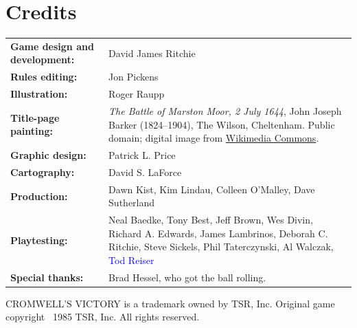\section*{Credits}

\begin{tcolorbox}[colback=cvsand!35,colframe=cvred,boxrule=.6pt,arc=1pt]
\small
\begin{tabularx}{\textwidth}{@{}>{\bfseries}l X@{}}
  Game design and development: & David James Ritchie \\
  Rules editing: & Jon Pickens \\
  Illustration: & Roger Raupp \\
  Title-page painting: & \textit{The Battle of Marston Moor, 2 July 1644}, John Joseph Barker (1824--1904), The Wilson, Cheltenham. Public domain; digital image from \href{https://commons.wikimedia.org/wiki/File:Battle_of_Marston_Moor_1644_by_John_Barker.png}{Wikimedia Commons}. \\
  Graphic design: & Patrick L. Price \\
  Cartography: & David S. LaForce \\
  Production: & Dawn Kist, Kim Lindau, Colleen O'Malley, Dave Sutherland \\
  Playtesting: & Neal Baedke, Tony Best, Jeff Brown, Wes Divin, Richard A. Edwards, James Lambrinos, Deborah C. Ritchie, Steve Sickels, Phil Taterczynski, Al Walczak, \textcolor{blue}{Tod Reiser} \\
  Special thanks: & Brad Hessel, who got the ball rolling. \\
\end{tabularx}

\medskip
\footnotesize CROMWELL'S VICTORY is a trademark owned by TSR, Inc.
Original game copyright \textcopyright\ 1985 TSR, Inc. All rights reserved.
\end{tcolorbox}

